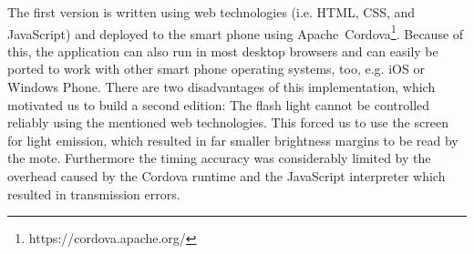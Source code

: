 \documentclass{sig-alternate} %
\begin{document}
The first version is written using web technologies (i.e. HTML, CSS, and JavaScript) and deployed to the smart phone using Apache~Cordova\footnote{https://cordova.apache.org/}.
Because of this, the application can also run in most desktop browsers and can easily be ported to work with other smart phone operating systems, too, e.g. iOS or Windows Phone.
There are two disadvantages of this implementation, which motivated us to build a second edition:
The flash light cannot be controlled reliably using the mentioned web technologies.
This forced us to use the screen for light emission, which resulted in far smaller brightness margins to be read by the mote.
Furthermore the timing accuracy was considerably limited by the overhead caused by the Cordova runtime and the JavaScript interpreter which resulted in transmission errors.

\end{document}
